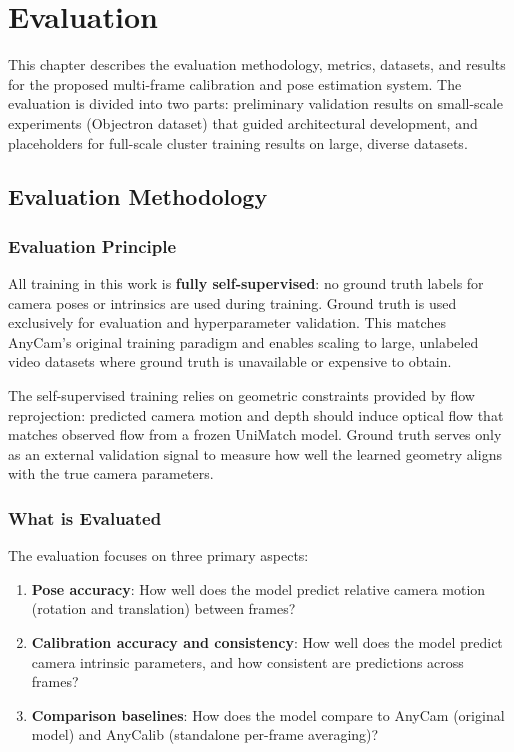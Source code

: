 
\chapter{Evaluation}\label{chapter:evaluation}

This chapter describes the evaluation methodology, metrics, datasets, and results for the proposed multi-frame calibration and pose estimation system. The evaluation is divided into two parts: preliminary validation results on small-scale experiments (Objectron dataset) that guided architectural development, and placeholders for full-scale cluster training results on large, diverse datasets.

\section{Evaluation Methodology}\label{sec:eval-methodology}

\subsection{Evaluation Principle}

All training in this work is \textbf{fully self-supervised}: no ground truth labels for camera poses or intrinsics are used during training. Ground truth is used exclusively for evaluation and hyperparameter validation. This matches AnyCam's original training paradigm and enables scaling to large, unlabeled video datasets where ground truth is unavailable or expensive to obtain.

The self-supervised training relies on geometric constraints provided by flow reprojection: predicted camera motion and depth should induce optical flow that matches observed flow from a frozen UniMatch model. Ground truth serves only as an external validation signal to measure how well the learned geometry aligns with the true camera parameters.

\subsection{What is Evaluated}

The evaluation focuses on three primary aspects:

\begin{enumerate}
    \item \textbf{Pose accuracy}: How well does the model predict relative camera motion (rotation and translation) between frames?
    \item \textbf{Calibration accuracy and consistency}: How well does the model predict camera intrinsic parameters, and how consistent are predictions across frames?
    \item \textbf{Comparison baselines}: How does the model compare to AnyCam (original model) and AnyCalib (standalone per-frame averaging)?
\end{enumerate}

